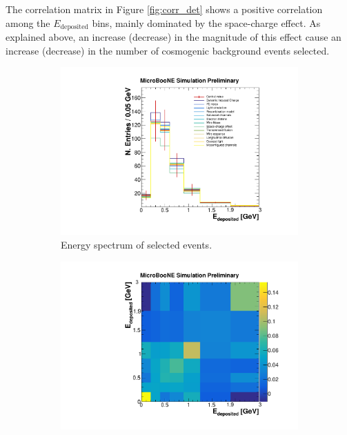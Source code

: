 The correlation matrix in Figure \ref{fig:corr_det} shows a positive correlation among the $E_{\mathrm{deposited}}$ bins, mainly dominated by the space-charge effect. As explained above, an increase (decrease) in the magnitude of this effect cause an increase (decrease) in the number of cosmogenic background events selected. 

\begin{figure}[htbp]
  \begin{center}
    \begin{subfigure}{0.49\textwidth}
      \includegraphics[width=\linewidth]{figures/reco_det.pdf}
      \caption{Energy spectrum of selected events.}  \label{fig:reco_det}
    \end{subfigure}\hfill
    \begin{subfigure}{0.49\textwidth}
      \includegraphics[width=\linewidth]{figures/frac_det.pdf}

\end{subfigure}
\end{center}
\end{figure}
